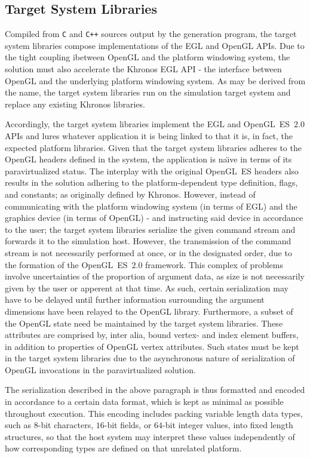 \subsection{Target System Libraries}
\label{sec:proposedsolutionandimplementation_targetsystemlibraries}
Compiled from \texttt{C} and \texttt{C++} sources output by the generation program, the target system libraries compose implementations of the EGL and OpenGL APIs.
Due to the tight coupling ibetween OpenGL and the platform windowing system, the solution must also accelerate the Khronos EGL API - the interface between OpenGL and the underlying platform windowing system.
As may be derived from the name, the target system libraries run on the simulation target system and replace any existing Khronos libraries.

Accordingly, the target system libraries implement the EGL and OpenGL~ES~$2.0$ APIs and lures whatever application it is being linked to that it is, in fact, the expected platform libraries.
Given that the target system libraries adheres to the OpenGL headers defined in the system, the application is na\"{\i}ve in terms of its paravirtualized status.
The interplay with the original OpenGL~ES headers also results in the solution adhering to the platform-dependent type definition, flags, and constants; as originally defined by Khronos.
However, instead of communicating with the platform windowing system (in terms of EGL) and the graphics device (in terms of OpenGL) - and instructing said device in accordance to the user; the target system libraries serialize the given command stream and forwards it to the simulation host.
However, the transmission of the command stream is not necessarily performed at once, or in the designated order, due to the formation of the OpenGL~ES~$2.0$ framework.
This complex of problems involve uncertainties of the proportion of argument data, as size is not necessarily given by the user or apperent at that time.
As such, certain serialization may have to be delayed until further information surrounding the argument dimensions have been relayed to the OpenGL library.
Furthermore, a subset of the OpenGL state need be maintained by the target system libraries.
These attributes are comprised by, inter alia, bound vertex- and index element buffers, in addition to properties of OpenGL vertex attributes.
Such states must be kept in the target system libraries due to the asynchronous nature of serialization of OpenGL invocations in the paravirtualized solution.

The serialization described in the above paragraph is thus formatted and encoded in accordance to a certain data format, which is kept as minimal as possible throughout execution.
This encoding includes packing variable length data types, such as $8$-bit characters, $16$-bit fields, or $64$-bit integer values, into fixed length structures, so that the host system may interpret these values independently of how corresponding types are defined on that unrelated platform.

